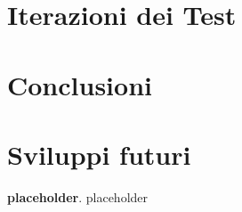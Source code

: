 \documentclass[a4paper,10pt]{memoir}
\begin{document}
\section{Iterazioni dei Test}

\section{Conclusioni}

\section{Sviluppi futuri}



\begin{thebibliography}{9}

	\textbf{placeholder}.
	placeholder

\end{thebibliography}
\end{document}
